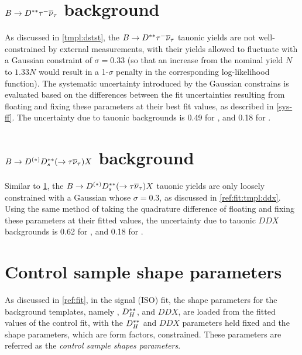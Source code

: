 \section{$B \rightarrow D^{**}{\tau^-}{{\overline{\nu}}_\tau}$ background}
\label{sys-tau-dstst}

As discussed in \cref{tmpl:dstst},
the $B \rightarrow D^{**} {\tau^-}{{\overline{\nu}}_\tau}$ tauonic yields are not well-constrained
by external measurements,
with their yields allowed to fluctuate with a Gaussian constraint of
$\sigma = 0.33$
(so that an increase from the nominal yield $N$ to $1.33N$ would result in a
1-$\sigma$ penalty in the corresponding log-likelihood function).
The systematic uncertainty introduced by the Gaussian constrains
is evaluated based on the differences between the fit uncertainties resulting
from floating and fixing these parameters at their best fit values,
as described in \cref{sys-ff}.
The uncertainty due to tauonic \Dstst backgrounds is 0.49 for \RD,
and 0.18 for \RDst.


\section{$B \rightarrow D^{(*)} D^{**}_s (\rightarrow \tau{\ensuremath{{\overline{\nu}}_\tau}}) X$ background}
\label{sys-tau-ddx}

Similar to \cref{sys-tau-dstst},
the $B \rightarrow D^{(*)} D^{**}_s (\rightarrow \tau{\ensuremath{{\overline{\nu}}_\tau}}) X$ tauonic yields
are only loosely constrained with a Gaussian whose $\sigma = 0.3$,
as discussed in \cref{ref:fit:tmpl:ddx}.
Using the same method of taking the quadrature difference of floating and fixing
these parameters at their fitted values,
the uncertainty due to tauonic $DDX$ backgrounds is 0.62 for \RD,
and 0.18 for \RDst.



\section{Control sample shape parameters}
\label{sys-model-ctrl}

As discussed in \cref{ref:fit},
in the signal (ISO) fit,
the shape parameters for the background templates,
namely \Dstst, $D^{**}_H$, and $DDX$,
are loaded from the fitted values of the control fit,
with the $D^{**}_H$ and $DDX$ parameters held fixed and the \Dstst
shape parameters,
which are form factors,
constrained.
These parameters are referred as the
\emph{control sample shapes parameters}.

